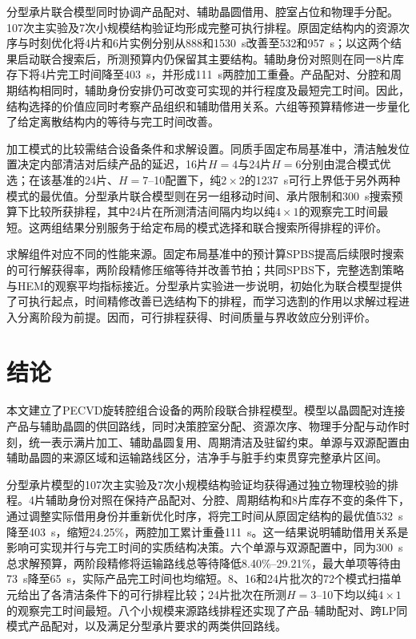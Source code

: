 \documentclass[final,5p,times,twocolumn]{elsarticle}
\begin{document}
分型承片联合模型同时协调产品配对、辅助晶圆借用、腔室占位和物理手分配。107次主实验及7次小规模结构验证均形成完整可执行排程。原固定结构内的资源次序与时刻优化将4片和6片实例分别从888和1530~s改善至532和957~s；以这两个结果启动联合搜索后，所测预算内仍保留其主要结构。辅助身份对照则在同一8片库存下将4片完工时间降至403~s，并形成111~s两腔加工重叠。产品配对、分腔和周期结构相同时，辅助身份安排仍可改变可实现的并行程度及最短完工时间。因此，结构选择的价值应同时考察产品组织和辅助借用关系。六组等预算精修进一步量化了给定离散结构内的等待与完工时间改善。

加工模式的比较需结合设备条件和求解设置。同质手固定布局基准中，清洁触发位置决定内部清洁对后续产品的延迟，16片$H=4$与24片$H=6$分别由混合模式优选；在该基准的24片、$H=7$--10配置下，纯$2\times2$的1237~s可行上界低于另外两种模式的最优值。分型承片联合模型则在另一组移动时间、承片限制和300~s搜索预算下比较所获排程，其中24片在所测清洁间隔内均以纯$4\times1$的观察完工时间最短。这两组结果分别服务于给定布局的模式选择和联合搜索所得排程的评价。

求解组件对应不同的性能来源。固定布局基准中的预计算SPBS提高后续限时搜索的可行解获得率，两阶段精修压缩等待并改善节拍；共同SPBS下，完整选割策略与HEM的观察平均指标接近。分型承片实验进一步说明，初始化为联合模型提供了可执行起点，时间精修改善已选结构下的排程，而学习选割的作用以求解过程进入分离阶段为前提。因而，可行排程获得、时间质量与界收敛应分别评价。

\FloatBarrier

\section{结论}

本文建立了PECVD旋转腔组合设备的两阶段联合排程模型。模型以晶圆配对连接产品与辅助晶圆的供回路线，同时决策腔室分配、资源次序、物理手分配与动作时刻，统一表示满片加工、辅助晶圆复用、周期清洁及驻留约束。单源与双源配置由辅助晶圆的来源区域和运输路线区分，洁净手与脏手约束贯穿完整承片区间。

分型承片模型的107次主实验及7次小规模结构验证均获得通过独立物理校验的排程。4片辅助身份对照在保持产品配对、分腔、周期结构和8片库存不变的条件下，通过调整实际借用身份并重新优化时序，将完工时间从原固定结构的最优值532~s降至403~s，缩短24.25\%，两腔加工累计重叠111~s。这一结果说明辅助借用关系是影响可实现并行与完工时间的实质结构决策。六个单源与双源配置中，同为300~s总求解预算，两阶段精修将运输路线总等待降低8.40\%--29.21\%，最大单项等待由73~s降至65~s，实际产品完工时间也均缩短。8、16和24片批次的72个模式扫描单元给出了各清洁条件下的可行排程比较；24片批次在所测$H=3$--10下均以纯$4\times1$的观察完工时间最短。八个小规模来源路线排程还实现了产品--辅助配对、跨LP同模式产品配对，以及满足分型承片要求的两类供回路线。
\end{document}

